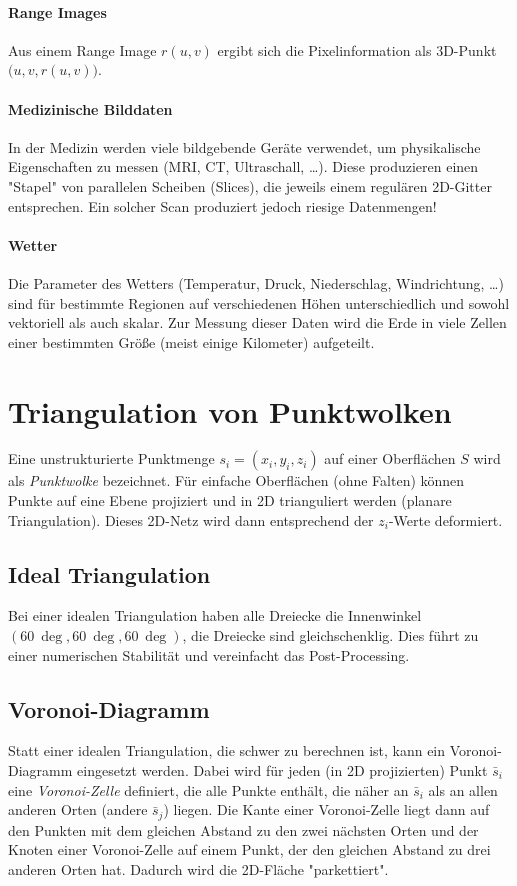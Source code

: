 		\paragraph{Range Images}
			Aus einem Range Image \( r(u, v) \) ergibt sich die Pixelinformation als 3D-Punkt \( \big(u, v, r(u, v)\big) \).

		\paragraph{Medizinische Bilddaten}
			In der Medizin werden viele bildgebende Geräte verwendet, um physikalische Eigenschaften zu messen (MRI, CT, Ultraschall, \dots). Diese produzieren einen "Stapel" von parallelen Scheiben (Slices), die jeweils einem regulären 2D-Gitter entsprechen. Ein solcher Scan produziert jedoch riesige Datenmengen!

		\paragraph{Wetter}
			Die Parameter des Wetters (\zB Temperatur, Druck, Niederschlag, Windrichtung, \dots) sind für bestimmte Regionen auf verschiedenen Höhen unterschiedlich und sowohl vektoriell als auch skalar. Zur Messung dieser Daten wird die Erde in viele Zellen einer bestimmten Größe (meist einige Kilometer) aufgeteilt.

	\section{Triangulation von Punktwolken}
		Eine unstrukturierte Punktmenge \( s_i = (x_i, y_i, z_i) \) auf einer Oberflächen \(S\) wird als \emph{Punktwolke} bezeichnet. Für einfache Oberflächen (ohne Falten) können Punkte auf eine Ebene projiziert und in 2D trianguliert werden (planare Triangulation). Dieses 2D-Netz wird dann entsprechend der \(z_i\)-Werte deformiert.

		\subsection{Ideal Triangulation}
			Bei einer idealen Triangulation haben alle Dreiecke die Innenwinkel \( (\SI{60}{\deg}, \SI{60}{\deg}, \SI{60}{\deg}) \), \dh die Dreiecke sind gleichschenklig. Dies führt zu einer numerischen Stabilität und vereinfacht das Post-Processing.

		\subsection{Voronoi-Diagramm}
			Statt einer idealen Triangulation, die schwer zu berechnen ist, kann ein Voronoi-Diagramm eingesetzt werden. Dabei wird für jeden (in 2D projizierten) Punkt \( \bar{s}_i \) eine \emph{Voronoi-Zelle} definiert, die alle Punkte enthält, die näher an \( \bar{s}_i \) als an allen anderen Orten (andere \( \bar{s}_j \)) liegen. Die Kante einer Voronoi-Zelle liegt dann auf den Punkten mit dem gleichen Abstand zu den zwei nächsten Orten und der Knoten einer Voronoi-Zelle auf einem Punkt, der den gleichen Abstand zu drei anderen Orten hat. Dadurch wird die 2D-Fläche "parkettiert".
		
